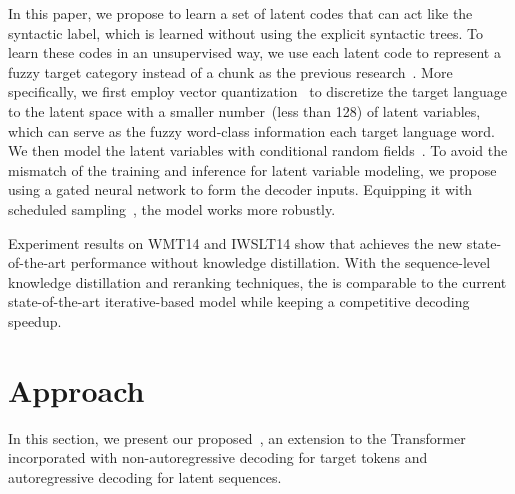 In this paper, we propose to learn a set of latent codes that can act like the syntactic label, which is learned without using the explicit syntactic trees. 
To learn these codes in an unsupervised way, we use each latent code to represent a fuzzy target category instead of a chunk as the previous research~\cite{syn_st}.
More specifically, we first employ vector quantization~\cite{vqvae} to discretize the target language to the latent space with a smaller number~(less than 128) of latent variables, which can serve as the fuzzy word-class information each target language word.
We then model the latent variables with conditional random fields~\cite[CRF,][]{crf,nat_crf}.
To avoid the mismatch of the training and inference for latent variable modeling, we propose using a gated neural network to form the decoder inputs. 
Equipping it with scheduled sampling~\cite{bengio2015scheduled}, the model works more robustly.

Experiment results on WMT14 and IWSLT14 show that \method achieves the new state-of-the-art performance without knowledge distillation. 
With the sequence-level knowledge distillation and reranking techniques, the \method is comparable to the current state-of-the-art iterative-based model while keeping a competitive decoding speedup.

\section{Approach}
In this section, we present our proposed~\method, an extension to the Transformer incorporated with non-autoregressive decoding for target tokens and autoregressive decoding for latent sequences. 

